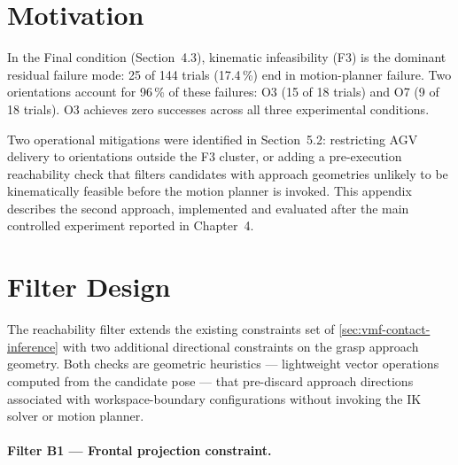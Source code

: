 \documentclass[12pt, a4paper]{report}
\begin{document}
\section{Motivation}
\label{sec:appendix-motivation}

In the Final condition (Section~4.3), kinematic infeasibility (F3) is the dominant residual failure mode: 25 of 144 trials (17.4\,\%) end in motion-planner failure. Two orientations account for 96\,\% of these failures: O3 (15 of 18 trials) and O7 (9 of 18 trials). O3 achieves zero successes across all three experimental conditions.


Two operational mitigations were identified in Section~5.2: restricting AGV delivery to orientations outside the F3 cluster, or adding a pre-execution reachability check that filters candidates with approach geometries unlikely to be kinematically feasible before the motion planner is invoked. This appendix describes the second approach, implemented and evaluated after the main controlled experiment reported in Chapter~4.

\section{Filter Design}
\label{sec:appendix-filter-design}
The reachability filter extends the existing constraints set of \cref{sec:vmf-contact-inference} with two additional directional constraints on the grasp approach geometry. Both checks are geometric heuristics — lightweight vector operations computed from the candidate pose — that pre-discard approach directions associated with workspace-boundary configurations without invoking the IK solver or motion planner.

\paragraph{Filter B1 — Frontal projection constraint.}
\end{document}
